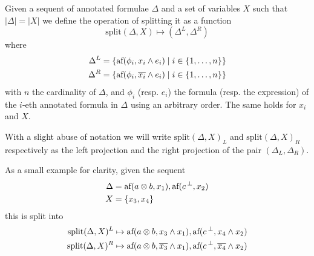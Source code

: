 \documentclass[a4paper, 12pt, tesi, english]{report}
\begin{document}
\begin{define}[Splitting]
	\label{def:split}
	Given a sequent of annotated formulae $\Delta$ and a set of variables $X$ such that $|\Delta| = |X|$ we define the operation of splitting it as a function
	$$ \text{split}(\Delta, X) \mapsto (\Delta^L, \Delta^R) $$
	where
	\begin{align*}
		\Delta^L &= \{ \text{af}(\phi_i, x_i \wedge e_i) \mid i \in \{1, \dots, n\}\} \\
		\Delta^R &= \{ \text{af}(\phi_i, \overline{x_i} \wedge e_i) \mid i \in \{1, \dots, n\}\}
	\end{align*}
	with $n$ the cardinality of $\Delta$, and $\phi_i$ (resp. $e_i$) the formula (resp. the expression) of the $i$-eth annotated formula in $\Delta$ using an arbitrary order.
	The same holds for $x_i$ and $X$.

	With a slight abuse of notation we will write $\text{split}(\Delta, X)_L$ and $\text{split}(\Delta, X)_R$ respectively as the left projection and the right projection of the pair $(\Delta_L, \Delta_R)$.
\end{define}
As a small example for clarity, given the sequent
\begin{align*}
	\Delta &= \text{af}(a \otimes b, x_1), \text{af}({c}\,^{\bot}, x_2) \\
	X      &= \{ x_3, x_4 \} 
\end{align*}
this is split into
\begin{align*}
	\text{split}(\Delta, X)^L &\mapsto \text{af}(a \otimes b, x_3 \wedge x_1), \text{af}({c}\,^{\bot}, x_4 \wedge x_2) \\
	\text{split}(\Delta, X)^R &\mapsto \text{af}(a \otimes b, \overline{x_3} \wedge x_1), \text{af}({c}\,^{\bot}, \overline{x_4} \wedge x_2) 
\end{align*}

\end{document}
